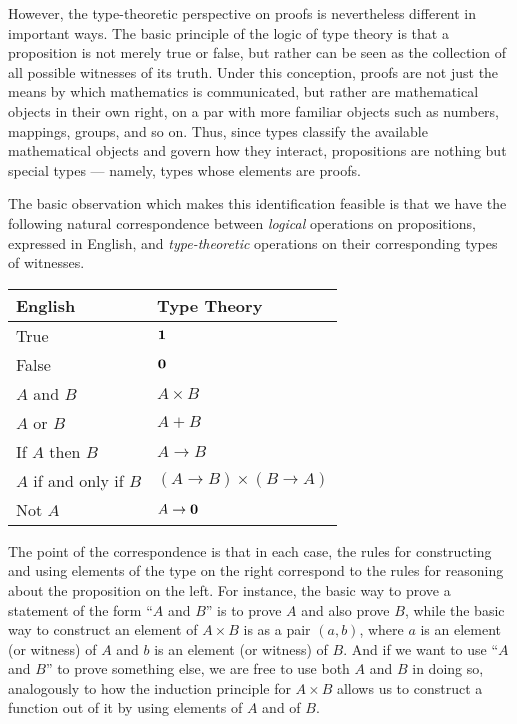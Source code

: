 However, the type-theoretic perspective on proofs is nevertheless different in important ways.
The basic principle of the logic of type theory is that a proposition is not merely true or false, but rather can be seen as the collection of all possible witnesses of its truth.
Under this conception, proofs are not just the means by which mathematics is communicated, but rather are mathematical objects in their own right, on a par with more familiar objects such as numbers, mappings, groups, and so on.
Thus, since types classify the available mathematical objects and govern how they interact, propositions are nothing but special  types --- namely, types whose elements are proofs.

The basic observation which makes this identification feasible is that we have the following natural correspondence between \emph{logical} operations on propositions, expressed in English, and \emph{type-theoretic} operations on their corresponding types of witnesses.
%
%
\begin{center}
\medskip
\begin{tabular}{ll}
  \toprule
  English & Type Theory\\
  \midrule
  True & $\mathbf{1}$ \\
  False & $\mathbf{0}$ \\
  $A$ and $B$ & $A \times B$ \\
  $A$ or $B$ & $A + B$ \\
  If $A$ then $B$ & $A \to B$ \\
  $A$ if and only if $B$ & $(A \to B) \times (B \to A)$ \\
  Not $A$ &  $A \to \mathbf{0}$ \\
  \bottomrule
\end{tabular}
\medskip
\end{center}

The point of the correspondence is that in each case, the rules for constructing and using elements of the type on the right correspond to the rules for reasoning about the proposition on the left.
For instance, the basic way to prove a statement of the form ``$A$ and $B$'' is to prove $A$ and also prove $B$, while the basic way to construct an element of $A\times B$ is as a pair $(a,b)$, where $a$ is an element (or witness) of $A$ and $b$ is an element (or witness) of $B$.
And if we want to use ``$A$ and $B$'' to prove something else, we are free to use both $A$ and $B$ in doing so, analogously to how the induction principle for $A\times B$ allows us to construct a function out of it by using elements of $A$ and of $B$.

